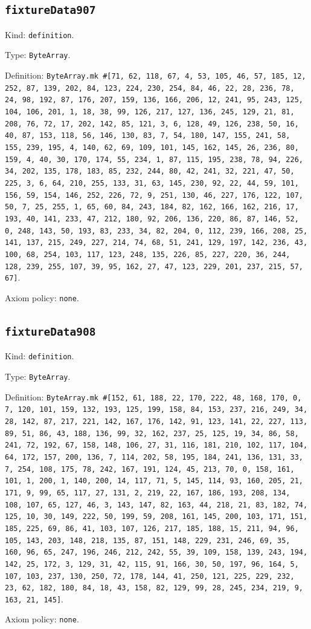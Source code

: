 \documentclass[11pt]{article}
\begin{document}
\subsection*{\texttt{fixtureData907}}
\noindent Kind: \texttt{definition}.\par
\noindent Type: \texttt{ByteArray}.\par
\noindent Definition: \texttt{ByteArray.mk \#[71, 62, 118, 67, 4, 53, 105, 46, 57, 185, 12, 252, 87, 139, 202, 84, 123, 224, 230, 254, 84, 46, 22, 28, 236, 78, 24, 98, 192, 87, 176, 207, 159, 136, 166, 206, 12, 241, 95, 243, 125, 104, 106, 201, 1, 18, 38, 99, 126, 217, 127, 136, 245, 129, 21, 81, 208, 76, 72, 17, 202, 142, 85, 121, 3, 6, 128, 49, 126, 238, 50, 16, 40, 87, 153, 118, 56, 146, 130, 83, 7, 54, 180, 147, 155, 241, 58, 155, 239, 195, 4, 140, 62, 69, 109, 101, 145, 162, 145, 26, 236, 80, 159, 4, 40, 30, 170, 174, 55, 234, 1, 87, 115, 195, 238, 78, 94, 226, 34, 202, 135, 178, 183, 85, 232, 244, 80, 42, 241, 32, 221, 47, 50, 225, 3, 6, 64, 210, 255, 133, 31, 63, 145, 230, 92, 22, 44, 59, 101, 156, 59, 154, 146, 252, 226, 72, 9, 251, 130, 46, 227, 176, 122, 107, 50, 7, 25, 255, 1, 65, 60, 84, 243, 184, 82, 162, 166, 162, 216, 17, 193, 40, 141, 233, 47, 212, 180, 92, 206, 136, 220, 86, 87, 146, 52, 0, 248, 143, 50, 193, 83, 233, 34, 82, 204, 0, 112, 239, 166, 208, 25, 141, 137, 215, 249, 227, 214, 74, 68, 51, 241, 129, 197, 142, 236, 43, 100, 68, 254, 103, 117, 123, 248, 135, 226, 85, 227, 220, 36, 244, 128, 239, 255, 107, 39, 95, 162, 27, 47, 123, 229, 201, 237, 215, 57, 67]}.\par
\noindent Axiom policy: \texttt{none}.\par
\subsection*{\texttt{fixtureData908}}
\noindent Kind: \texttt{definition}.\par
\noindent Type: \texttt{ByteArray}.\par
\noindent Definition: \texttt{ByteArray.mk \#[152, 61, 188, 22, 170, 222, 48, 168, 170, 0, 7, 120, 101, 159, 132, 193, 125, 199, 158, 84, 153, 237, 216, 249, 34, 28, 142, 87, 217, 221, 142, 167, 176, 142, 91, 123, 141, 22, 227, 113, 89, 51, 86, 43, 188, 136, 99, 32, 162, 237, 25, 125, 19, 34, 86, 58, 241, 72, 192, 67, 158, 148, 106, 27, 31, 116, 181, 210, 102, 117, 104, 64, 172, 157, 200, 136, 7, 114, 202, 58, 195, 184, 241, 136, 131, 33, 7, 254, 108, 175, 78, 242, 167, 191, 124, 45, 213, 70, 0, 158, 161, 101, 1, 200, 1, 140, 200, 14, 117, 71, 5, 145, 114, 93, 160, 205, 21, 171, 9, 99, 65, 117, 27, 131, 2, 219, 22, 167, 186, 193, 208, 134, 108, 107, 65, 127, 46, 3, 143, 147, 82, 163, 44, 218, 21, 83, 182, 74, 125, 10, 30, 149, 222, 50, 199, 59, 208, 161, 145, 200, 103, 171, 151, 185, 225, 69, 86, 41, 103, 107, 126, 217, 185, 188, 15, 211, 94, 96, 105, 143, 203, 148, 218, 135, 87, 151, 148, 229, 231, 246, 69, 35, 160, 96, 65, 247, 196, 246, 212, 242, 55, 39, 109, 158, 139, 243, 194, 142, 25, 172, 3, 129, 31, 42, 115, 91, 166, 30, 50, 197, 96, 164, 5, 107, 103, 237, 130, 250, 72, 178, 144, 41, 250, 121, 225, 229, 232, 23, 62, 182, 180, 84, 18, 43, 158, 82, 129, 99, 28, 245, 234, 219, 9, 163, 21, 145]}.\par
\noindent Axiom policy: \texttt{none}.\par
\end{document}
